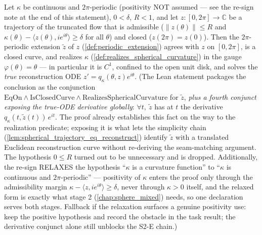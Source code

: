 \begin{lemma}
  \label{lem:reconstruction_ode}
  Let $\kappa$ be continuous and $2\pi$-periodic (positivity NOT assumed — see the
  re-sign note at the end of this statement), $0<\delta$, $R<1$, and let
  $z:[0,2\pi]\to\mathbb C$ be a trajectory of the truncated flow that is admissible
  ($\|z(\theta)\|\le R$ and $\kappa(\theta)-\langle z(\theta),ie^{i\theta}\rangle\ge\delta$
  for all $\theta$) and closed ($z(2\pi)=z(0)$). Then the $2\pi$-periodic extension
  $\tilde z$ of $z$ (\cref{def:periodic_extension}) agrees with $z$ on $[0,2\pi]$, is a
  closed curve, and realizes $\kappa$ (\cref{def:realizes_spherical_curvature}) in the
  gauge $\varphi(\theta)=\theta$ — in particular it is $C^1$, confined to the open unit
  disk, and solves the \emph{true} reconstruction ODE $z'=q_\kappa(\theta,z)e^{i\theta}$.
  (The Lean statement packages the conclusion as the conjunction
  $\mathrm{EqOn}\wedge\mathrm{IsClosedCurve}\wedge\mathrm{RealizesSphericalCurvature}$
  for $\tilde z$, \emph{plus a fourth conjunct exposing the true-ODE derivative
  globally}: $\forall t,\ \tilde z$ has at $t$ the derivative
  $q_\kappa(t,\tilde z(t))\,e^{it}$. The proof already establishes this fact on the way
  to the realization predicate; exposing it is what lets the simplicity chain
  (\cref{lem:spherical_trajectory_eq_reconstruct}) identify $\tilde z$ with a translated
  Euclidean reconstruction curve without re-deriving the seam-matching argument. The
  hypothesis $0\le R$ turned out to be unnecessary and is dropped. Additionally, the
  re-sign RELAXES the hypothesis ``$\kappa$ is a curvature function'' to ``$\kappa$ is
  continuous and $2\pi$-periodic'' — positivity of $\kappa$ enters the proof only
  through the admissibility margin $\kappa-\langle z,ie^{i\theta}\rangle\ge\delta$,
  never through $\kappa>0$ itself, and the relaxed form is exactly what stage 2
  (\cref{chap:sphere_mixed}) needs, so one declaration serves both stages. Fallback if
  the relaxation surfaces a genuine positivity use: keep the positive hypothesis and
  record the obstacle in the task result; the derivative conjunct alone still unblocks
  the S2-E chain.)
\end{lemma}

